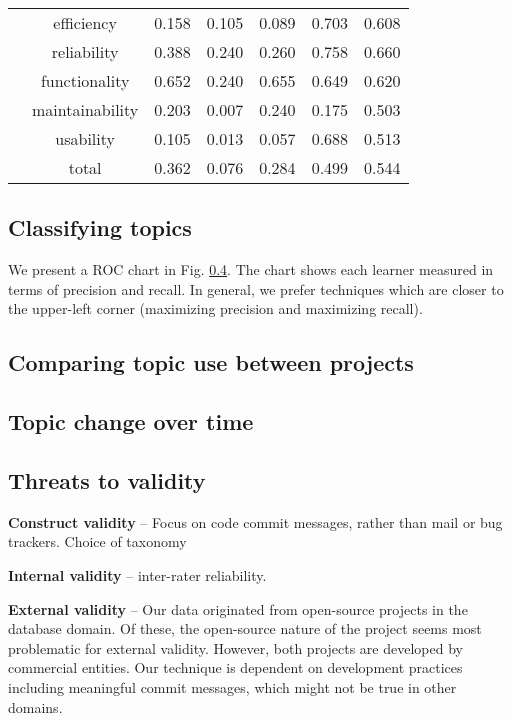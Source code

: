 \documentclass{acm_proc_article-sp}
\begin{document}
\begin{table*}[h]
\begin{tabular}{c|c|c|c|c|c|c}
 & efficiency & 0.158 & 0.105 & 0.089 & 0.703 & 0.608 \\ 
 & reliability & 0.388 & 0.240 & 0.260 & 0.758 & 0.660 \\ 
 & functionality & 0.652 & 0.240 & 0.655 & 0.649 & 0.620 \\ 
 & maintainability & 0.203 & 0.007 & 0.240 & 0.175 & 0.503 \\ 
 & usability & 0.105 & 0.013 & 0.057 & 0.688 & 0.513 \\ 
 & total & 0.362 & 0.076 & 0.284 & 0.499 & 0.544 \\
\bottomrule
\end{tabular}
\end{table*}

\subsection{Classifying topics}
We present a ROC chart in Fig. \ref{}. The chart shows each learner measured in terms of precision and recall. In general, we prefer techniques which are closer to the upper-left corner (maximizing precision and maximizing recall). 

\subsection{Comparing topic use between projects}


\subsection{Topic change over time}


\subsection{Threats to validity}
\textbf{Construct validity} -- Focus on code commit messages, rather than mail or bug trackers. Choice of taxonomy

\textbf{Internal validity} -- inter-rater reliability.

\textbf{External validity} -- Our data originated from open-source projects in the database domain. Of these, the open-source nature of the project seems most problematic for external validity. However, both projects are developed by commercial entities. Our technique is dependent on development practices including meaningful commit messages, which might not be true in other domains.
\end{document}
